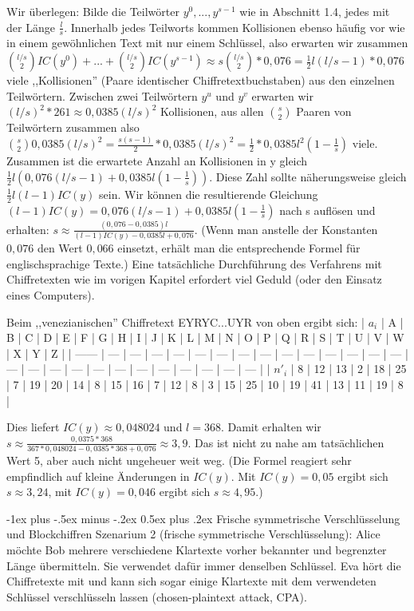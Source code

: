 \documentclass[a4paper]{article}
\makeatletter
\renewcommand{\section}{\@startsection{section}{1}{0mm}%
 {-1ex plus -.5ex minus -.2ex}%
 {0.5ex plus .2ex}%
 {\normalfont\large\bfseries}}
\makeatother
\begin{document}
\begin{multicols}{3}
    Wir überlegen: Bilde die Teilwörter $y^0,...,y^{s-1}$ wie in Abschnitt 1.4, jedes mit der Länge $\frac{l}{s}$. Innerhalb jedes Teilworts kommen Kollisionen ebenso häufig vor wie in einem gewöhnlichen Text mit nur einem Schlüssel, also erwarten wir zusammen $\binom{l/s}{2} IC(y^0)+...+\binom{l/s}{2} IC(y^{s-1})\approx s\binom{l/s}{2}* 0,076 = \frac{1}{2}l(l/s-1)* 0,076$ viele ,,Kollisionen''  (Paare identischer Chiffretextbuchstaben) aus den einzelnen Teilwörtern.
    Zwischen zwei Teilwörtern $y^u$ und $y^v$ erwarten wir $(l/s)^2*261\approx 0,0385(l/s)^2$ Kollisionen, aus allen $\binom{s}{2}$ Paaren von Teilwörtern zusammen also $\binom{s}{2} 0,0385(l/s)^2 =\frac{s(s-1)}{2}* 0,0385(l/s)^2 =\frac{1}{2} *0,0385 l^2 (1-\frac{1}{s})$ viele. Zusammen ist die erwartete Anzahl an Kollisionen in y gleich $\frac{1}{2}l(0,076(l/s-1) + 0,0385 l(1-\frac{1}{s}))$.
    Diese Zahl sollte näherungsweise gleich $\frac{1}{2}l(l-1)IC(y)$ sein. Wir können die resultierende Gleichung $(l-1)IC(y) = 0,076(l/s-1) + 0,0385 l(1-\frac{1}{s})$ nach s auflösen und erhalten: $s\approx \frac{(0,076-0,0385)l}{(l-1)IC(y)-0,0385l+0,076}$. (Wenn man anstelle der Konstanten $0,076$ den Wert $0,066$ einsetzt, erhält man die entsprechende Formel für englischsprachige Texte.)
    Eine tatsächliche Durchführung des Verfahrens mit Chiffretexten wie im vorigen Kapitel erfordert viel Geduld (oder den Einsatz eines Computers).

    Beim ,,venezianischen'' Chiffretext EYRYC...UYR von oben ergibt sich:
    | $a_i$  | A   | B   | C   | D   | E   | F   | G   | H   | I   | J   | K   | L   | M   | N   | O   | P   | Q   | R   | S   | T   | U   | V   | W   | X   | Y   | Z   |
    | ------ | --- | --- | --- | --- | --- | --- | --- | --- | --- | --- | --- | --- | --- | --- | --- | --- | --- | --- | --- | --- | --- | --- | --- | --- | --- | --- |
    | $n'_i$ | 8   | 12  | 13  | 2   | 18  | 25  | 7   | 19  | 20  | 14  | 8   | 15  | 16  | 7   | 12  | 8   | 3   | 15  | 25  | 10  | 19  | 41  | 13  | 11  | 19  | 8   |

    Dies liefert $IC(y)\approx 0,048024$ und $l=368$. Damit erhalten wir $s\approx\frac{0,0375*368}{367 *0,048024-0,0385 *368+0,076}\approx 3,9$.
    Das ist nicht zu nahe am tatsächlichen Wert 5, aber auch nicht ungeheuer weit weg. (Die Formel reagiert sehr empfindlich auf kleine Änderungen in $IC(y)$. Mit $IC(y)=0,05$ ergibt sich $s\approx 3,24$, mit $IC(y)=0,046$ ergibt sich $s\approx 4,95$.)

    \section{Frische symmetrische Verschlüsselung und Blockchiffren}
    Szenarium 2 (frische symmetrische Verschlüsselung): Alice möchte Bob mehrere verschiedene Klartexte vorher bekannter und begrenzter Länge übermitteln. Sie verwendet dafür immer denselben Schlüssel. Eva hört die Chiffretexte mit und kann sich sogar einige Klartexte mit dem verwendeten Schlüssel verschlüsseln lassen (chosen-plaintext attack, CPA).


\end{multicols}
\end{document}

